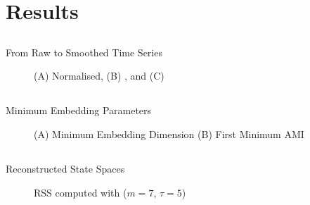
\section{Results}

\subsection{}
{

\begin{frame}{From Raw to Smoothed Time Series}
    \begin{figure}
	\caption{(A) Normalised, (B) , and (C)  } 
   \end{figure}
	
\end{frame}
}



\subsection{}
{

\begin{frame}{Minimum Embedding Parameters}
    \begin{figure}
	\caption{(A) Minimum Embedding Dimension 
		 (B) First Minimum AMI
		}  
   \end{figure}
	
\end{frame}
}



\subsection{}
{

\begin{frame}{Reconstructed State Spaces}
    \begin{figure}
	\caption{RSS computed with ($m=7$, $\tau=5$)} 
   \end{figure}
	
\end{frame}
}




